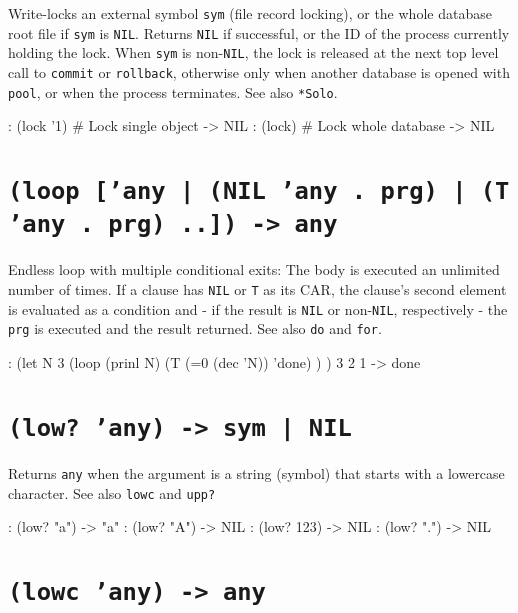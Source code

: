 Write-locks an external symbol \texttt{sym} (file record locking), or the whole
database root file if \texttt{sym} is \texttt{NIL}. Returns \texttt{NIL} if successful, or
the ID of the process currently holding the lock. When \texttt{sym} is
non-\texttt{NIL}, the lock is released at the next top level call to \texttt{commit}
or \texttt{rollback}, otherwise only when another database is opened with
\texttt{pool}, or when the process terminates. See also \texttt{*Solo}.


\begin{wideverbatim}
: (lock '{1})        # Lock single object
-> NIL
: (lock)             # Lock whole database
-> NIL
\end{wideverbatim}

 
\section*{\texttt{(loop ['any | (NIL 'any . prg) | (T 'any . prg) ..]) -> any}}
\label{sec:func-ref-L-(loop ['any | (NIL 'any . prg) | (T 'any . prg) ..]) -> any}


Endless loop with multiple conditional exits: The body is executed an
unlimited number of times. If a clause has \texttt{NIL} or \texttt{T} as its CAR, the
clause's second element is evaluated as a condition and - if the result
is \texttt{NIL} or non-\texttt{NIL}, respectively - the \texttt{prg} is executed and the
result returned. See also \texttt{do} and \texttt{for}.


\begin{wideverbatim}
: (let N 3
   (loop
      (prinl N)
      (T (=0 (dec 'N)) 'done) ) )
3
2
1
-> done
\end{wideverbatim}

 
\section*{\texttt{(low? 'any) -> sym | NIL}}
\label{sec:func-ref-L-(low? 'any) -> sym | NIL}


Returns \texttt{any} when the argument is a string (symbol) that starts with a
lowercase character. See also \texttt{lowc} and \texttt{upp?}


\begin{wideverbatim}
: (low? "a")
-> "a"
: (low? "A")
-> NIL
: (low? 123)
-> NIL
: (low? ".")
-> NIL
\end{wideverbatim}

 
\section*{\texttt{(lowc 'any) -> any}}
\label{sec:func-ref-L-(lowc 'any) -> any}


